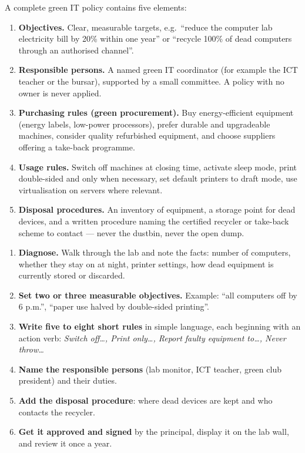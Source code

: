 \documentclass[11pt]{article}
\newcommand{\cle}[1]{{\popxbold\color{popdark}#1}}
\begin{document}
A complete green IT policy contains five elements:

\begin{enumerate}
\item \textbf{Objectives.} Clear, measurable targets, e.g.\ ``reduce the computer lab electricity bill by 20\% within one year'' or ``recycle 100\% of dead computers through an authorised channel''.
\item \textbf{Responsible persons.} A named \cle{green IT coordinator} (for example the ICT teacher or the bursar), supported by a small committee. A policy with no owner is never applied.
\item \textbf{Purchasing rules (green procurement).} Buy energy-efficient equipment (energy labels, low-power processors), prefer durable and upgradeable machines, consider quality refurbished equipment, and choose suppliers offering a \cle{take-back} programme.
\item \textbf{Usage rules.} Switch off machines at closing time, activate sleep mode, print double-sided and only when necessary, set default printers to draft mode, use virtualisation on servers where relevant.
\item \textbf{Disposal procedures.} An inventory of equipment, a storage point for dead devices, and a written procedure naming the certified recycler or take-back scheme to contact — never the dustbin, never the open dump.
\end{enumerate}

\begin{methode}
\begin{enumerate}
\item \textbf{Diagnose.} Walk through the lab and note the facts: number of computers, whether they stay on at night, printer settings, how dead equipment is currently stored or discarded.
\item \textbf{Set two or three measurable objectives.} Example: ``all computers off by 6 p.m.'', ``paper use halved by double-sided printing''.
\item \textbf{Write five to eight short rules} in simple language, each beginning with an action verb: \emph{Switch off\ldots, Print only\ldots, Report faulty equipment to\ldots, Never throw\ldots}
\item \textbf{Name the responsible persons} (lab monitor, ICT teacher, green club president) and their duties.
\item \textbf{Add the disposal procedure}: where dead devices are kept and who contacts the recycler.
\item \textbf{Get it approved and signed} by the principal, display it on the lab wall, and review it once a year.
\end{enumerate}
\end{methode}
\end{document}
